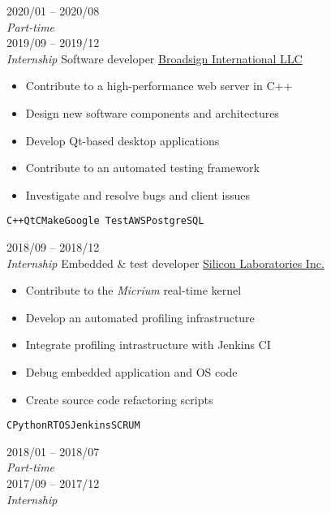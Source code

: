 \documentclass[9pt]{developercv} %
\begin{document}
\begin{minipage}[t]{0.8\textwidth}

\begin{entrylist}
	\entry
		{2020/01 -- 2020/08\\{\small\emph{Part-time}}\\2019/09 -- 2019/12\\{\small\emph{Internship}}}
		{Software developer}
		{\href{https://broadsign.com/}{Broadsign International LLC}}
		{
			\vspace{-14pt}
			\begin{itemize}
				\renewcommand{\labelitemi}{\raisebox{.45ex}{\rule{.6ex}{.6ex}}}
				\setlength\itemsep{-1pt}
				\item Contribute to a high-performance web server in C++
				\item Design new software components and architectures
				\item Develop Qt-based desktop applications
				\item Contribute to an automated testing framework
				\item Investigate and resolve bugs and client issues
			\end{itemize}
			\vspace{-4pt}
			\texttt{C++}\slashsep\texttt{Qt}\slashsep\texttt{CMake}\slashsep\texttt{Google Test}\slashsep\texttt{AWS}\slashsep\texttt{PostgreSQL}
		}
	\entry
		{2018/09 -- 2018/12\\{\small\emph{Internship}}}
		{Embedded \& test developer}
		{\href{https://www.silabs.com/}{Silicon Laboratories Inc.}}
		{
			\vspace{-14pt}
			\begin{itemize}
				\renewcommand{\labelitemi}{\raisebox{.45ex}{\rule{.6ex}{.6ex}}}
				\setlength\itemsep{-1pt}
				\item Contribute to the \emph{Micrium} real-time kernel
				\item Develop an automated profiling infrastructure
				\item Integrate profiling intrastructure with Jenkins CI
				\item Debug embedded application and OS code
				\item Create source code refactoring scripts
			\end{itemize}
			\vspace{-4pt}
			\texttt{C}\slashsep\texttt{Python}\slashsep\texttt{RTOS}\slashsep\texttt{Jenkins}\slashsep\texttt{SCRUM}
		}
	\entry
		{2018/01 -- 2018/07\\{\small\emph{Part-time}}\\2017/09 -- 2017/12\\{\small\emph{Internship}}}

\end{entrylist}
\end{minipage}
\end{document}
